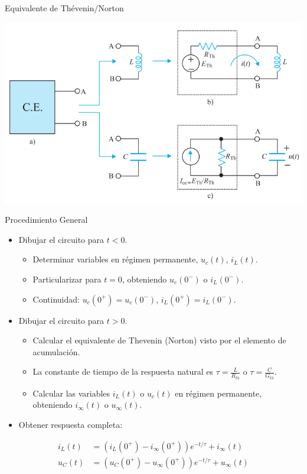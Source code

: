 \documentclass[aspectratio=169, usenames,svgnames,dvipsnames]{beamer}
\begin{document}
\begin{frame}[label={sec:org26a7d5d}]{Equivalente de Thévenin/Norton}
\begin{center}
\includegraphics[height=0.85\textheight]{../figs/Thevenin_PrimerOrden.pdf}
\end{center}
\end{frame}
\begin{frame}[label={sec:orgd77c834}]{Procedimiento General}
\begin{itemize}
\item Dibujar el circuito para \(t < 0\).
\begin{itemize}
\item Determinar variables en régimen permanente, \(u_c(t)\), \(i_L(t)\).
\item Particularizar para \(t = 0\), obteniendo \(u_c(0^-)\) o \(i_L(0^-)\).
\item Continuidad: \(u_c(0^+) = u_c(0^-)\), \(i_L(0^+) = i_L(0^-)\).
\end{itemize}
\item Dibujar el circuito para \(t > 0\).
\begin{itemize}
\item Calcular el equivalente de Thevenin (Norton) visto por el elemento de acumulación.
\item La constante de tiempo de la respuesta natural es \(\tau = \frac{L}{R_{th}}\) o \(\tau = \frac{C}{G_{th}}\).
\item Calcular las variables \(i_L(t)\) o \(u_c(t)\) en régimen permanente, obteniendo \(i_\infty(t)\) o \(u_\infty(t)\).
\end{itemize}
\item Obtener respuesta completa:
\end{itemize}
\begin{align*}
i_L(t) &= \left(i_L(0^+) - i_\infty(0^+)\right) e^{-t/\tau} + i_\infty(t)\\
u_C(t) &= \left(u_C(0^+) - u_\infty(0^+)\right) e^{-t/\tau} + u_\infty(t)\\
\end{align*}
\end{frame}
\end{document}
